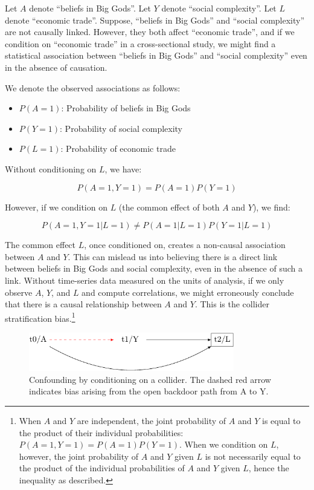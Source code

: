 \documentclass[
  singlecolumn]{report}
\providecommand{\tightlist}{%
  \setlength{\itemsep}{0pt}\setlength{\parskip}{0pt}}\usepackage{longtable,booktabs,array}
\begin{document}
Let \(A\) denote ``beliefs in Big Gods''. Let \(Y\) denote ``social
complexity''. Let \(L\) denote ``economic trade''. Suppose, ``beliefs in
Big Gods'' and ``social complexity'' are not causally linked. However,
they both affect ``economic trade'', and if we condition on ``economic
trade'' in a cross-sectional study, we might find a statistical
association between ``beliefs in Big Gods'' and ``social complexity''
even in the absence of causation.

We denote the observed associations as follows:

\begin{itemize}
\tightlist
\item
  \(P(A = 1)\): Probability of beliefs in Big Gods
\item
  \(P(Y = 1)\): Probability of social complexity
\item
  \(P(L = 1)\): Probability of economic trade
\end{itemize}

Without conditioning on \(L\), we have:

\[P(A = 1, Y = 1) = P(A = 1)P(Y = 1)\]

However, if we condition on \(L\) (the common effect of both \(A\) and
\(Y\)), we find:

\[P(A = 1, Y = 1 | L = 1) \neq P(A = 1 | L = 1)P(Y = 1 | L = 1)\]

The common effect \(L\), once conditioned on, creates a non-causal
association between \(A\) and \(Y\). This can mislead us into believing
there is a direct link between beliefs in Big Gods and social
complexity, even in the absence of such a link. Without time-series data
measured on the units of analysis, if we only observe \(A\), \(Y\), and
\(L\) and compute correlations, we might erroneously conclude that there
is a causal relationship between \(A\) and \(Y\). This is the collider
stratification bias.\footnote{When \(A\) and \(Y\) are independent, the
  joint probability of \(A\) and \(Y\) is equal to the product of their
  individual probabilities: \(P(A = 1, Y = 1) = P(A = 1)P(Y = 1)\). When
  we condition on \(L\), however, the joint probability of \(A\) and
  \(Y\) given \(L\) is not necessarily equal to the product of the
  individual probabilities of \(A\) and \(Y\) given \(L\), hence the
  inequality as described.}

\begin{figure}

{\centering \includegraphics[width=0.8\textwidth,height=\textheight]{causal-dags_files/figure-pdf/fig-dag-common-effect-1.pdf}

}

\caption{\label{fig-dag-common-effect}Confounding by conditioning on a
collider. The dashed red arrow indicates bias arising from the open
backdoor path from A to Y.}

\end{figure}
\end{document}
